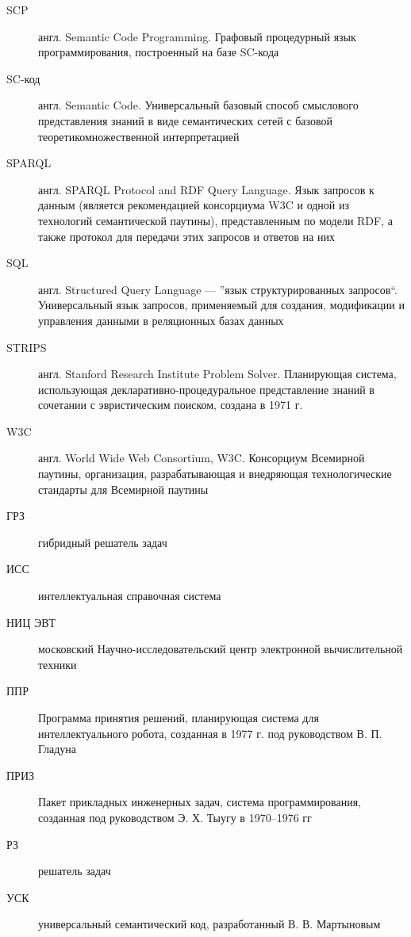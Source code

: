 \begin{description}
\item[SCP] англ. Semantic Code Programming. Графовый процедурный язык программирования, построенный на базе SC-кода
\item[SC-код] англ. Semantic Code. Универсальный базовый способ смыслового представления знаний в виде семантических сетей с базовой теоретикомножественной интерпретацией
\item[SPARQL] англ. SPARQL Protocol and RDF Query Language. Язык запросов к данным (является рекомендацией консорциума W3C и одной из технологий семантической паутины), представленным по модели RDF, а также протокол для передачи этих запросов и ответов на них
\item[SQL] англ. Structured Query Language --- ''язык структурированных запросов``. Универсальный язык запросов, применяемый для создания, модификации и управления данными в реляционных базах данных
\item[STRIPS] англ. Stanford Research Institute Problem Solver. Планирующая система, использующая декларативно-процедуральное представление знаний в сочетании с эвристическим поиском, создана в 1971 г.
\item[W3C] англ. World Wide Web Consortium, W3C. Консорциум Всемирной паутины, организация, разрабатывающая и внедряющая технологические стандарты для Всемирной паутины
\item[ГРЗ] гибридный решатель задач
\item[ИСС] интеллектуальная справочная система
\item[НИЦ ЭВТ] московский Научно-исследовательский центр электронной вычислительной техники
\item[ППР] Программа принятия решений, планирующая система для интеллектуального робота, созданная в 1977 г. под руководством В. П. Гладуна
\item[ПРИЗ] Пакет прикладных инженерных задач, система программирования, созданная под руководством Э. Х. Тыугу в 1970–1976 гг
\item[РЗ] решатель задач
\item[УСК] универсальный семантический код, разработанный В. В. Мартыновым
\end{description}
